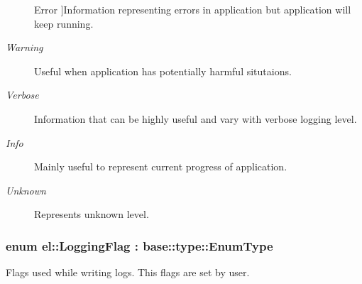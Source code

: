 \begin{Desc}
\begin{description}
{Error\hypertarget{namespaceel_ab0ac6091262344c52dd2d3ad099e8e36a902b0d55fddef6f8d651fe1035b7d4bd}{}\label{namespaceel_ab0ac6091262344c52dd2d3ad099e8e36a902b0d55fddef6f8d651fe1035b7d4bd}
}]Information representing errors in application but application will keep running. \item[{\em 
Warning\hypertarget{namespaceel_ab0ac6091262344c52dd2d3ad099e8e36a0eaadb4fcb48a0a0ed7bc9868be9fbaa}{}\label{namespaceel_ab0ac6091262344c52dd2d3ad099e8e36a0eaadb4fcb48a0a0ed7bc9868be9fbaa}
}]Useful when application has potentially harmful situtaions. \item[{\em 
Verbose\hypertarget{namespaceel_ab0ac6091262344c52dd2d3ad099e8e36ad4a9fa383ab700c5bdd6f31cf7df0faf}{}\label{namespaceel_ab0ac6091262344c52dd2d3ad099e8e36ad4a9fa383ab700c5bdd6f31cf7df0faf}
}]Information that can be highly useful and vary with verbose logging level. \item[{\em 
Info\hypertarget{namespaceel_ab0ac6091262344c52dd2d3ad099e8e36a4059b0251f66a18cb56f544728796875}{}\label{namespaceel_ab0ac6091262344c52dd2d3ad099e8e36a4059b0251f66a18cb56f544728796875}
}]Mainly useful to represent current progress of application. \item[{\em 
Unknown\hypertarget{namespaceel_ab0ac6091262344c52dd2d3ad099e8e36a88183b946cc5f0e8c96b2e66e1c74a7e}{}\label{namespaceel_ab0ac6091262344c52dd2d3ad099e8e36a88183b946cc5f0e8c96b2e66e1c74a7e}
}]Represents unknown level. \end{description}
\end{Desc}
\subsubsection[{\texorpdfstring{Logging\+Flag}{LoggingFlag}}]{\setlength{\rightskip}{0pt plus 5cm}enum {\bf el\+::\+Logging\+Flag} \+: base\+::type\+::\+Enum\+Type\hspace{0.3cm}{\ttfamily [strong]}}\hypertarget{namespaceel_a2784aacd04cb7816ac1c0b20fcbf83cb}{}\label{namespaceel_a2784aacd04cb7816ac1c0b20fcbf83cb}


Flags used while writing logs. This flags are set by user. 

